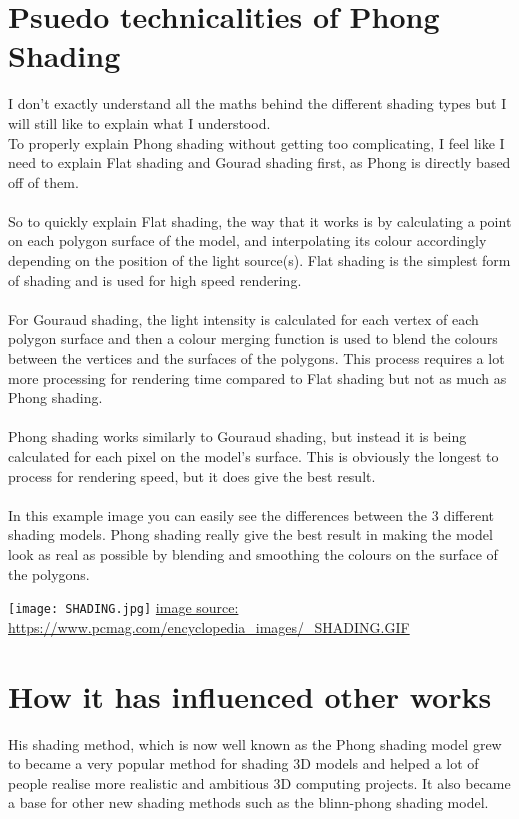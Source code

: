 \documentclass{scrartcl}
\begin{document}
\section{Psuedo technicalities of Phong Shading}
I don't exactly understand all the maths behind the different shading types but I will still like to explain what I understood.\\
To properly explain Phong shading without getting too complicating, I feel like I need to explain Flat shading and Gourad shading first, as Phong is directly based off of them.
\\~\\
So to quickly explain Flat shading, the way that it works is by calculating a point on each polygon surface of the model, and interpolating its colour accordingly depending on the position of the light source(s).
Flat shading is the simplest form of shading and is used for high speed rendering.
\\~\\
For Gouraud shading, the light intensity is calculated for each vertex  of each polygon surface and then a colour merging function is used to blend the colours between the vertices and the surfaces of the polygons. This process requires a lot more processing for rendering time compared to Flat shading but not as much as Phong shading.\cite{one}\cite{six}\cite{seven}
\\~\\
Phong shading works similarly to Gouraud shading, but instead it is being calculated for each pixel on the model's surface. This is obviously the longest to process for rendering speed, but it does give the best result.\cite{one}\cite{six}
\\~\\
In this example image you can easily see the differences between the 3 different shading models. Phong shading really give the best result in making the model look as real as possible by blending and smoothing the colours on the surface of the polygons.
\begin{center}
\texttt{[image: SHADING.jpg]}
{\footnotesize \url{image source: https://www.pcmag.com/encyclopedia_images/_SHADING.GIF}}
\end{center}

\section{How it has influenced other works}
His shading method, which is now well known as the Phong shading model grew to became a very popular method for shading 3D models and helped a lot of people realise more realistic and ambitious 3D computing projects. It also became a base for other new shading methods such as the blinn-phong shading model.
\end{document}
